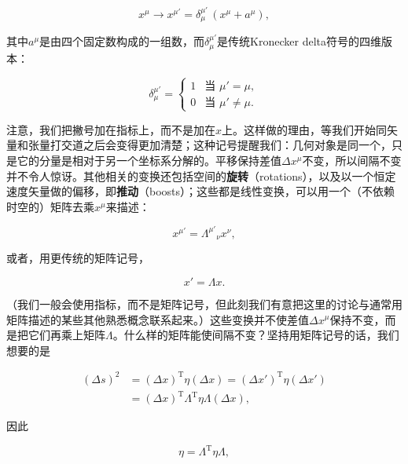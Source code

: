 \begin{equation*}
x^\mu \rightarrow x^{\mu'} = \delta^{\mu'}_{\mu}\,(x^\mu + a^\mu),
\tag{1.23}
\end{equation*}

其中$a^\mu$是由四个固定数构成的一组数，而$\delta^{\mu'}_{\mu}$是传统Kronecker delta符号的四维版本：

\begin{equation*}
\delta^{\mu'}_{\mu} =
\begin{cases}
1 & \text{当 } \mu' = \mu, \\
0 & \text{当 } \mu' \neq \mu.
\end{cases}
\tag{1.24}
\end{equation*}

注意，我们把撇号加在指标上，而不是加在$x$上。这样做的理由，等我们开始同矢量和张量打交道之后会变得更加清楚；这种记号提醒我们：几何对象是同一个，只是它的分量是相对于另一个坐标系分解的。平移保持差值$\Delta x^\mu$不变，所以间隔不变并不令人惊讶。其他相关的变换还包括空间的\textbf{旋转}（rotations），以及以一个恒定速度矢量做的偏移，即\textbf{推动}（boosts）；这些都是线性变换，可以用一个（不依赖时空的）矩阵去乘$x^\mu$来描述：

\begin{equation*}
x^{\mu'} = \Lambda^{\mu'}{}_{\nu}x^\nu,
\tag{1.25}
\end{equation*}

或者，用更传统的矩阵记号，

\begin{equation*}
x' = \Lambda x.
\tag{1.26}
\end{equation*}

（我们一般会使用指标，而不是矩阵记号，但此刻我们有意把这里的讨论与通常用矩阵描述的某些其他熟悉概念联系起来。）这些变换并不使差值$\Delta x^\mu$保持不变，而是把它们再乘上矩阵$\Lambda$。什么样的矩阵能使间隔不变？坚持用矩阵记号的话，我们想要的是

\begin{equation*}
\begin{aligned}
(\Delta s)^2 &= (\Delta x)^{\mathrm{T}}\eta(\Delta x) = (\Delta x')^{\mathrm{T}}\eta(\Delta x') \\
&= (\Delta x)^{\mathrm{T}}\Lambda^{\mathrm{T}}\eta\Lambda(\Delta x),
\end{aligned}
\tag{1.27}
\end{equation*}

因此

\begin{equation*}
\eta = \Lambda^{\mathrm{T}}\eta\Lambda,
\tag{1.28}
\end{equation*}

